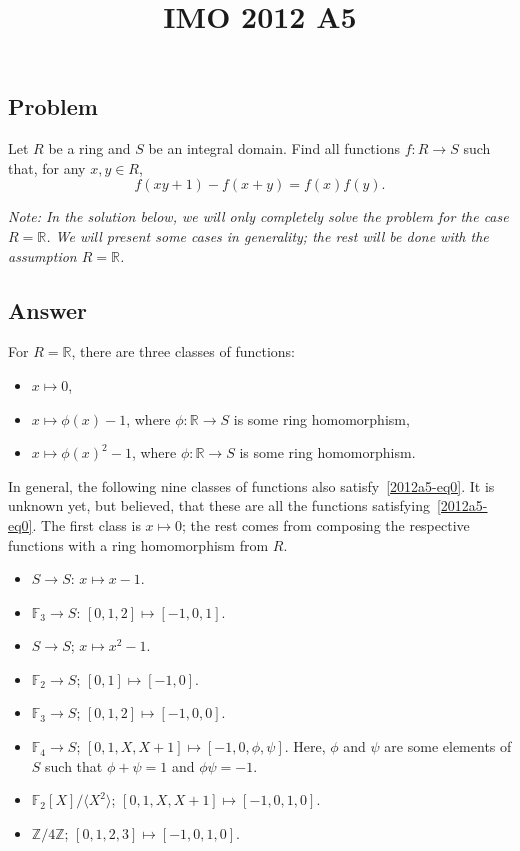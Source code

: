 \documentclass{article}
\title{IMO 2012 A5}
\author{}
\date{}
\newcommand{\F}{\mathbb{F}}
\newcommand{\R}{\mathbb{R}}
\newcommand{\Z}{\mathbb{Z}}
\begin{document}
\maketitle



\subsection*{Problem}

Let $R$ be a ring and $S$ be an integral domain.
Find all functions $f : R \to S$ such that, for any $x, y \in R$,
\[ f(xy + 1) - f(x + y) = f(x) f(y). \tag{*}\label{2012a5-eq0} \]

\textit{
    Note: In the solution below, we will only completely solve the problem for the case $R = \R$.
    We will present some cases in generality; the rest will be done with the assumption $R = \R$.}



\subsection*{Answer}

For $R = \R$, there are three classes of functions:
\begin{itemize}
    \item   $x \mapsto 0$,
    \item   $x \mapsto \phi(x) - 1$, where $\phi : \R \to S$ is some ring homomorphism,
    \item   $x \mapsto \phi(x)^2 - 1$, where $\phi : \R \to S$ is some ring homomorphism.
\end{itemize}

In general, the following nine classes of functions also satisfy~\eqref{2012a5-eq0}.
It is unknown yet, but believed, that these are all the functions satisfying~\eqref{2012a5-eq0}.
The first class is $x \mapsto 0$; the rest comes from composing the respective functions with a ring homomorphism from $R$.
\begin{itemize}
    \item   $S \to S$: $x \mapsto x - 1$.
    \item   $\F_3 \to S$: $[0, 1, 2] \mapsto [-1, 0, 1]$.
    \item   $S \to S$; $x \mapsto x^2 - 1$.
    \item   $\F_2 \to S$; $[0, 1] \mapsto [-1, 0]$.
    \item   $\F_3 \to S$; $[0, 1, 2] \mapsto [-1, 0, 0]$.
    \item   $\F_4 \to S$; $[0, 1, X, X + 1] \mapsto [-1, 0, \phi, \psi]$.
            Here, $\phi$ and $\psi$ are some elements of $S$ such that $\phi + \psi = 1$ and $\phi \psi = -1$.
    \item   $\F_2[X]/\langle X^2 \rangle$; $[0, 1, X, X + 1] \mapsto [-1, 0, 1, 0]$.
    \item   $\Z/4\Z$; $[0, 1, 2, 3] \mapsto [-1, 0, 1, 0]$.
\end{itemize}
\end{document}
